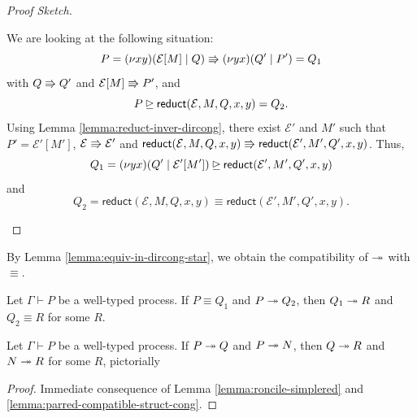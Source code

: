 \begin{proof}[Proof Sketch]
\begin{enumerate}[itemsep=1em, label=Case:, leftmargin=*]
      We are looking at the following situation:
      \[
        P = (\nu x y)(\mathcal{E}[M] \mid Q) \Rrightarrow (\nu y x)(Q' \mid P') = Q_1
      \]
      with $Q \Rrightarrow Q'$ and $\mathcal{E}[M] \Rrightarrow P'$, and
      \[
        P \unrhd \mathsf{reduct}(\mathcal{E}, M, Q, x, y) = Q_2.
      \]
      Using Lemma \ref{lemma:reduct-inver-dircong}, there exist $\mathcal{E}'$ and $M'$
      such that $P' = \mathcal{E}'[M']$, $\mathcal{E} \Rrightarrow \mathcal{E}'$ and
      $\mathsf{reduct}(\mathcal{E}, M, Q, x, y) \Rrightarrow \mathsf{reduct}(\mathcal{E}', M', Q', x, y)$.
      Thus,
      \[
        Q_1 = (\nu y x)(Q' \mid \mathcal{E}'[M']) \unrhd \mathsf{reduct}(\mathcal{E}', M', Q', x, y)
      \]
      and
      \[
        Q_2 = \mathsf{reduct}(\mathcal{E}, M, Q, x, y) \equiv \mathsf{reduct}(\mathcal{E}', M', Q', x, y).
      \]
  \end{enumerate}
\end{proof}

By Lemma \ref{lemma:equiv-in-dircong-star}, we obtain the compatibility of
$\twoheadrightarrow$ with $\equiv$.

\begin{lemma} \label{lemma:parred-compatible-struct-cong}
  Let $\Gamma \vdash P$ be a well-typed process.
  If $P \equiv Q_1$ and $P \twoheadrightarrow Q_2$, then $Q_1 \twoheadrightarrow R$ and $Q_2 \equiv R$ for some $R$.
\end{lemma}

\begin{lemma} \label{lemma:church-rosser-for-parred}
  Let $\Gamma \vdash P$ be a well-typed process.
  If $P \twoheadrightarrow Q$ and $P \twoheadrightarrow N$, then $Q \twoheadrightarrow R$ and $N \twoheadrightarrow R$ for some $R$, pictorially
  \begin{center}
  \end{center}
\end{lemma}
\begin{proof}
  Immediate consequence of Lemma \ref{lemma:roncile-simplered} and \ref{lemma:parred-compatible-struct-cong}.
\end{proof}

